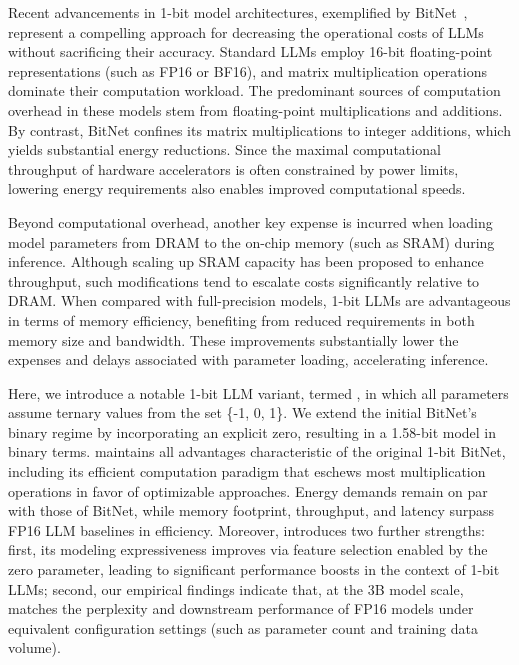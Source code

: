 Recent advancements in 1-bit model architectures, exemplified by BitNet~\cite{bitnet}, represent a compelling approach for decreasing the operational costs of LLMs without sacrificing their accuracy. Standard LLMs employ 16-bit floating-point representations (such as FP16 or BF16), and matrix multiplication operations dominate their computation workload. The predominant sources of computation overhead in these models stem from floating-point multiplications and additions. By contrast, BitNet confines its matrix multiplications to integer additions, which yields substantial energy reductions. Since the maximal computational throughput of hardware accelerators is often constrained by power limits, lowering energy requirements also enables improved computational speeds.

Beyond computational overhead, another key expense is incurred when loading model parameters from DRAM to the on-chip memory (such as SRAM) during inference. Although scaling up SRAM capacity has been proposed to enhance throughput, such modifications tend to escalate costs significantly relative to DRAM. When compared with full-precision models, 1-bit LLMs are advantageous in terms of memory efficiency, benefiting from reduced requirements in both memory size and bandwidth. These improvements substantially lower the expenses and delays associated with parameter loading, accelerating inference.

Here, we introduce a notable 1-bit LLM variant, termed \textbf{}, in which all parameters assume ternary values from the set \{-1, 0, 1\}. We extend the initial BitNet’s binary regime by incorporating an explicit zero, resulting in a 1.58-bit model in binary terms.  maintains all advantages characteristic of the original 1-bit BitNet, including its efficient computation paradigm that eschews most multiplication operations in favor of optimizable approaches. Energy demands remain on par with those of BitNet, while memory footprint, throughput, and latency surpass FP16 LLM baselines in efficiency. Moreover,  introduces two further strengths: first, its modeling expressiveness improves via feature selection enabled by the zero parameter, leading to significant performance boosts in the context of 1-bit LLMs; second, our empirical findings indicate that, at the 3B model scale,  matches the perplexity and downstream performance of FP16 models under equivalent configuration settings (such as parameter count and training data volume).

